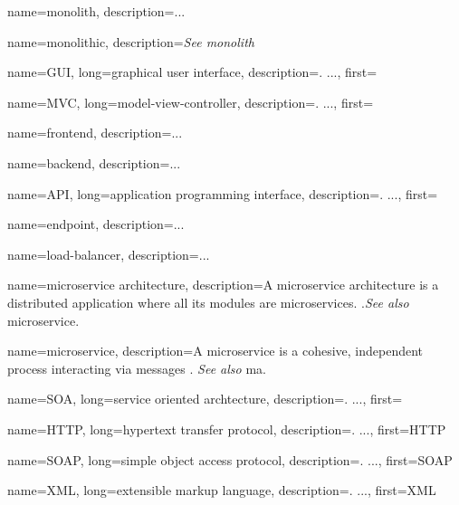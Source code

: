 




{
    name=monolith,
    description={...} %
}
    
{
    name=monolithic,
    description={\textit{See \gls{monolith}}}
}
    
{
    name=GUI,
    long={graphical user interface},
    description={. ...},%
    first=
}

{
    name=MVC,
    long={model-view-controller},
    description={. ...},
    first=
}

{
    name=frontend,
    description={...} %
}

{
    name=backend,
    description={...} %
}

{
    name=API,
    long={application programming interface},
    description={. ...},%
    first=
}

{
    name=endpoint,
    description={...} %
}

{
    name=load-balancer,
    description={...} %
}

{
    name=microservice architecture,
    description={A microservice architecture is a distributed application where
    all its modules are microservices. \autocite{Dragoni_etal_2017}.\textit{See
    also} \gls{microservice}.} %
}

{
    name=microservice,
    description={A microservice is a cohesive, independent process interacting
    via messages \autocite{Dragoni_etal_2017}. \textit{See also} \gls{ma}.} %
}

{
    name=SOA,
    long={service oriented archtecture},
    description={. ...},%
    first=
}

{
    name=HTTP,
    long={hypertext transfer protocol},
    description={. ...},%
    first=HTTP %
}

{
    name=SOAP,
    long={simple object access protocol},
    description={. ...},%
    first=SOAP
}

{
    name=XML,
    long={extensible markup language},
    description={. ...},%
    first=XML
}